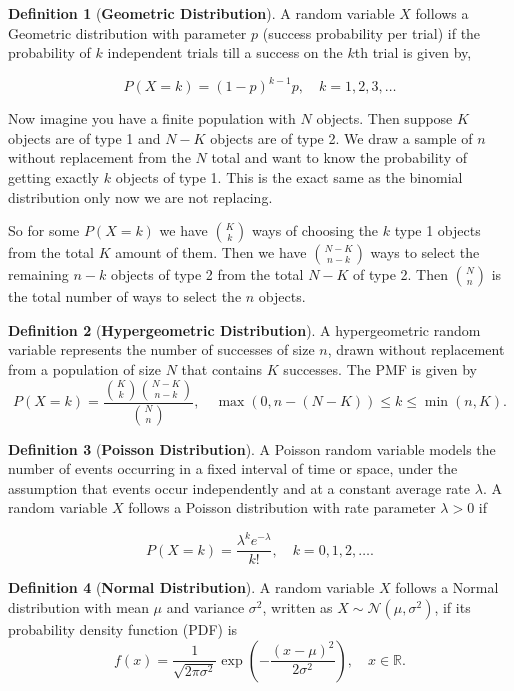 \documentclass{article}
\theoremstyle{definition}
\newtheorem{definition}{Definition}[section]
\theoremstyle{remark}
\begin{document}
\begin{definition}[\textbf{Geometric Distribution}]
A random variable \( X \) follows a Geometric distribution with parameter \( p \) (success probability per trial) if the probability of $k$ independent trials till a success on the $k$th trial is given by,

\[
P(X = k) = (1 - p)^{k-1} p, \quad k = 1, 2, 3, \dots
\]
\end{definition}

\par Now imagine you have a finite population with 
$N$ objects. Then suppose $K$ objects are of type 1 and $N-K$ objects
are of type 2. We draw a sample of $n$ without replacement from the $N$ total and 
want to know the probability of getting exactly $k$ objects of type 1. This is the exact 
same as the binomial distribution only now we are not replacing. 
\par So for some $P(X=k)$ we have $\binom{K}{k}$ ways 
of choosing the $k$ type 1 objects from the total $K$ amount of them. Then we have $\binom{N-K}{n-k}$ ways
to select the remaining $n-k$ objects of type 2 from the total $N-K$ of type 2.
Then $\binom{N}{n}$ is the total number of ways to select the $n$ objects. 

\begin{definition}[\textbf{Hypergeometric Distribution}]
A hypergeometric random variable represents the number of successes of size $n$, drawn without replacement from a population of size \( N \) that contains \( K \) successes. The PMF is given by
\[
P(X = k) = \frac{\binom{K}{k} \binom{N - K}{n - k}}{\binom{N}{n}}, \quad \max(0, n - (N - K)) \leq k \leq \min(n, K).
\]
\end{definition}



\begin{definition}[\textbf{Poisson Distribution}]
A Poisson random variable models the number of events occurring in a fixed interval of time or space, under the assumption that events occur independently and at a constant average rate \( \lambda \).
A random variable \( X \) follows a Poisson distribution with rate parameter \( \lambda > 0 \) if

\[
P(X = k) = \frac{\lambda^k e^{-\lambda}}{k!}, \quad k = 0, 1, 2, \dots.
\]


\end{definition}


\begin{definition}[\textbf{Normal Distribution}]
A random variable \( X \) follows a Normal distribution with mean \( \mu \) and variance \( \sigma^2 \), written as \( X \sim \mathcal{N}(\mu, \sigma^2) \), if its probability density function (PDF) is
\[
f(x) = \frac{1}{\sqrt{2\pi\sigma^2}} \exp \left( -\frac{(x - \mu)^2}{2\sigma^2} \right), \quad x \in \mathbb{R}.
\]
\end{definition}
\end{document}
